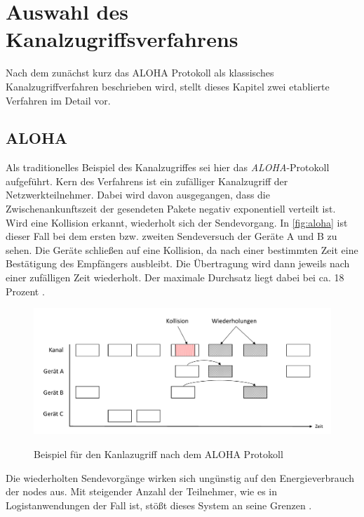 \chapter{Auswahl des Kanalzugriffsverfahrens}\label{kap:zugriffsverfahren}

Nach dem zunächst kurz das ALOHA Protokoll als klassisches Kanalzugriffverfahren beschrieben wird, stellt dieses Kapitel zwei etablierte Verfahren im Detail vor.

\section{ALOHA}
Als traditionelles Beispiel des Kanalzugriffes sei hier das \emph{ALOHA}-Protokoll aufgeführt. Kern des Verfahrens ist ein zufälliger Kanalzugriff der Netzwerkteilnehmer. Dabei wird davon ausgegangen, dass die Zwischenankunftszeit der gesendeten Pakete negativ exponentiell verteilt ist. Wird eine Kollision erkannt, wiederholt sich der Sendevorgang. In \autoref{fig:aloha} ist dieser Fall bei dem ersten bzw. zweiten Sendeversuch der Geräte A und B zu sehen. Die Geräte schließen auf eine Kollision, da nach einer bestimmten Zeit eine Bestätigung des Empfängers ausbleibt. Die Übertragung wird dann jeweils nach einer zufälligen Zeit wiederholt. Der maximale Durchsatz liegt dabei bei ca. 18 Prozent \citep{aloha}. 

\begin{figure}[bth]
        \myfloatalign
        {\includegraphics[width=1\linewidth]{gfx/ALOHA}} 
        \caption[ALOHA]{Beispiel für den Kanlazugriff nach dem ALOHA Protokoll }\label{fig:aloha}
\end{figure}

Die wiederholten Sendevorgänge wirken sich ungünstig auf den Energieverbrauch der \glspl{node} aus. Mit steigender Anzahl der Teilnehmer, wie es in Logistanwendungen der Fall ist, stößt dieses System an seine Grenzen \citep{inBinTestbed}. 

